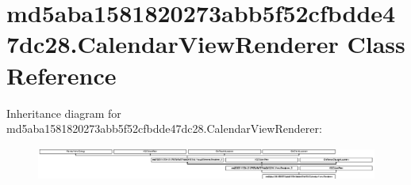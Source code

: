 \hypertarget{classmd5aba1581820273abb5f52cfbdde47dc28_1_1CalendarViewRenderer}{}\section{md5aba1581820273abb5f52cfbdde47dc28.\+Calendar\+View\+Renderer Class Reference}
\label{classmd5aba1581820273abb5f52cfbdde47dc28_1_1CalendarViewRenderer}
Inheritance diagram for md5aba1581820273abb5f52cfbdde47dc28.\+Calendar\+View\+Renderer\+:\begin{figure}[H]
\begin{center}
\leavevmode
\includegraphics[height=1.098039cm]{classmd5aba1581820273abb5f52cfbdde47dc28_1_1CalendarViewRenderer}
\end{center}
\end{figure}
